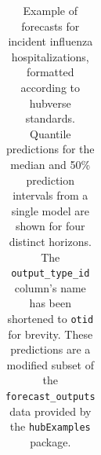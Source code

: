 \documentclass[
  letterpaper,
  DIV=11,
  numbers=noendperiod]{scrartcl}
\begin{document}
\begin{longtable}[]{@{}
  >{\raggedright\arraybackslash}p{}
  >{\raggedright\arraybackslash}p{}
  >{\raggedright\arraybackslash}p{}
  >{\raggedleft\arraybackslash}p{}
  >{\raggedright\arraybackslash}p{}
  >{\raggedright\arraybackslash}p{}
  >{\raggedright\arraybackslash}p{}
  >{\raggedleft\arraybackslash}p{}@{}}

\caption{\label{tbl-example-forecasts}Example of forecasts for incident
influenza hospitalizations, formatted according to hubverse standards.
Quantile predictions for the median and 50\% prediction intervals from a
single model are shown for four distinct horizons. The
\texttt{output\_type\_id} column's name has been shortened to
\texttt{otid} for brevity. These predictions are a modified subset of
the \texttt{forecast\_outputs} data provided by the \texttt{hubExamples}
package.}

\tabularnewline


\end{longtable}
\end{document}
